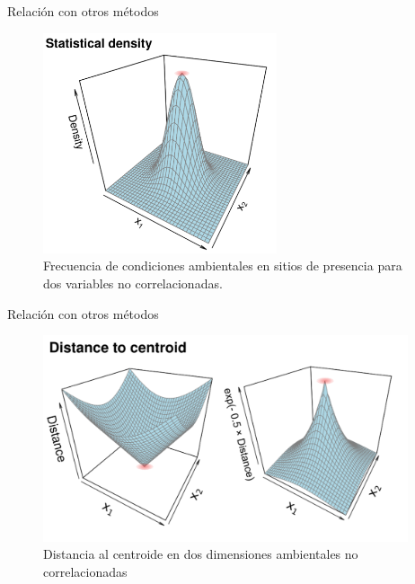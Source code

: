 \documentclass[
  11pt,
  ignorenonframetext,
]{beamer}
\begin{document}
\begin{frame}{Relación con otros métodos}
\protect\hypertarget{relaciuxf3n-con-otros-muxe9todos-2}{}
\begin{figure}

{\centering \includegraphics[width=2.71in]{Figuras/Figuras-centroide/Stat-density} 

}

\caption{Frecuencia de condiciones ambientales en sitios de presencia para dos variables no correlacionadas.}\label{fig:unnamed-chunk-7}
\end{figure}
\end{frame}

\begin{frame}{Relación con otros métodos}
\protect\hypertarget{relaciuxf3n-con-otros-muxe9todos-3}{}
\begin{figure}

{\centering \includegraphics[width=4.23in]{Figuras/Figuras-centroide/Distance-centroid} 

}

\caption{Distancia al centroide en dos dimensiones ambientales no correlacionadas}\label{fig:unnamed-chunk-8}
\end{figure}
\end{frame}
\end{document}
